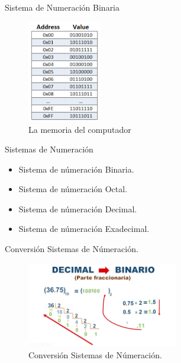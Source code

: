 \documentclass[presentation, aspectratio=54]{beamer}
\begin{document}
\begin{frame}[label={sec:org1f1fcb6}]{Sistema de Numeración Binaria}
\begin{figure}[htbp]
\centering
\includegraphics[width=120px]{./images/memoria.png}
\caption{La memoria del computador}
\end{figure}
\end{frame}

\begin{frame}[label={sec:orgd7a0206}]{Sistemas de Numeración}
\begin{itemize}
\item Sistema de númeración Binaria.
\item Sistema de númeración Octal.
\item Sistema de númeración Decimal.
\item Sistema de númeración Exadecimal.
\end{itemize}
\end{frame}

\begin{frame}[label={sec:org0339e3d}]{Conversión Sistemas de Númeración.}
\begin{figure}[htbp]
\centering
\includegraphics[width=250px]{./images/DecimalBinario.jpg}
\caption{Conversión Sistemas de Númeración.}
\end{figure}
\end{frame}
\end{document}
